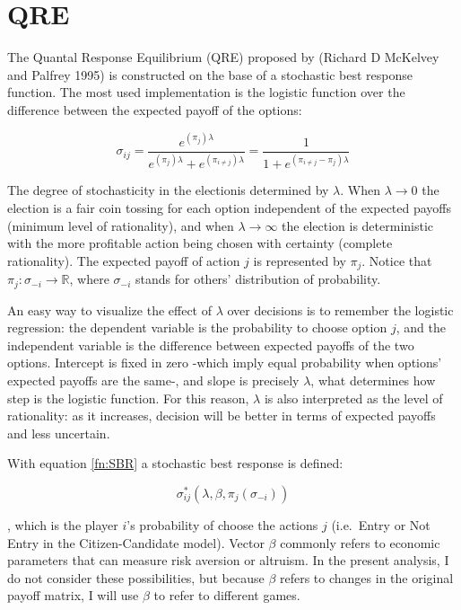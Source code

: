 
\section{QRE}

The Quantal Response Equilibrium (QRE) proposed by (Richard D McKelvey
and Palfrey 1995) is constructed on the base of a stochastic best
response function. The most used implementation is the logistic function
over the difference between the expected payoff of the options:

\begin{equation}\label{fn:SBR}
\sigma_{ij}= \displaystyle\frac{e^{(\pi_{j})\lambda}}{e^{(\pi_{j})\lambda}+e^{(\pi_{i\ne j})\lambda} } 
=\displaystyle\frac{1}{1+e^{(\pi_{i\ne j}-\pi_{j})\lambda }}        
\end{equation}

The degree of stochasticity in the electionis determined by \(\lambda\). When
\(\lambda \rightarrow 0\) the election is a fair coin tossing for each
option independent of the expected payoffs (minimum level of
rationality), and when \(\lambda \rightarrow \infty\) the election is
deterministic with the more profitable action being chosen with
certainty (complete rationality). The expected payoff of action \(j\) is
represented by \(\pi_j\). Notice that $\pi_j: \sigma_{-i} \rightarrow \mathbb{R}$, where $\sigma_{-i}$ stands for others' distribution of probability.

An easy way to visualize the effect of \(\lambda\) over decisions is to
remember the logistic regression: the dependent variable is the
probability to choose option \(j\), and the independent variable is the
difference between expected payoffs of the two options. Intercept is
fixed in zero -which imply equal probability when options' expected
payoffs are the same-, and slope is precisely \(\lambda\), what
determines how step is the logistic function. For this reason,
\(\lambda\) is also interpreted as the level of rationality: as it
increases, decision will be better in terms of expected payoffs and less
uncertain.


With equation \ref{fn:SBR} a stochastic best response is defined:

\begin{equation}
\sigma^*_{ij}(\lambda, \beta, \pi_{j}(\sigma_{-i}))
\end{equation}\label{eq:SBR} 

, which is the player \(i\)'s probability of choose the
actions \(j\) (i.e.~Entry or Not Entry in the Citizen-Candidate model).
Vector \(\beta\) commonly refers to economic parameters that can measure
risk aversion or altruism. In the present analysis, I do not consider
these possibilities, but because \(\beta\) refers to changes in the
original payoff matrix, I will use \(\beta\) to refer to different
games.

